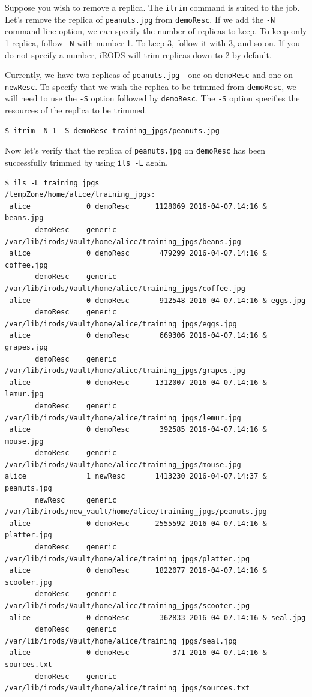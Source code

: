 \documentclass[10pt,oneside]{memoir}
\begin{document}
Suppose you wish to remove a replica. The \texttt{itrim} command is suited to the job. Let's remove the replica of \texttt{peanuts.jpg} from \texttt{demoResc}. If we add the \texttt{-N} command line option, we can specify the number of replicas to keep. To keep only 1 replica, follow \texttt{-N} with number 1. To keep 3, follow it with 3, and so on. If you do not specify a number, iRODS will trim replicas down to 2 by default.


Currently, we have two replicas of \texttt{peanuts.jpg}---one on \texttt{demoResc} and one on \texttt{newResc}. To specify that we wish the replica to be trimmed from \texttt{demoResc}, we will need to use the \texttt{-S} option followed by \texttt{demoResc}. The \texttt{-S} option specifies the resources of the replica to be trimmed.

\begin{lstlisting}
$ itrim -N 1 -S demoResc training_jpgs/peanuts.jpg
\end{lstlisting}

Now let's verify that the replica of \texttt{peanuts.jpg} on \texttt{demoResc} has been successfully trimmed by using \texttt{ils -L} again.

\begin{lstlisting}[basicstyle=\tiny\rmfamily]
$ ils -L training_jpgs
/tempZone/home/alice/training_jpgs:
 alice             0 demoResc      1128069 2016-04-07.14:16 & beans.jpg
       demoResc    generic    /var/lib/irods/Vault/home/alice/training_jpgs/beans.jpg
 alice             0 demoResc       479299 2016-04-07.14:16 & coffee.jpg
       demoResc    generic    /var/lib/irods/Vault/home/alice/training_jpgs/coffee.jpg
 alice             0 demoResc       912548 2016-04-07.14:16 & eggs.jpg
       demoResc    generic    /var/lib/irods/Vault/home/alice/training_jpgs/eggs.jpg
 alice             0 demoResc       669306 2016-04-07.14:16 & grapes.jpg
       demoResc    generic    /var/lib/irods/Vault/home/alice/training_jpgs/grapes.jpg
 alice             0 demoResc      1312007 2016-04-07.14:16 & lemur.jpg
       demoResc    generic    /var/lib/irods/Vault/home/alice/training_jpgs/lemur.jpg
 alice             0 demoResc       392585 2016-04-07.14:16 & mouse.jpg
       demoResc    generic    /var/lib/irods/Vault/home/alice/training_jpgs/mouse.jpg
alice              1 newResc       1413230 2016-04-07.14:37 & peanuts.jpg
       newResc     generic    /var/lib/irods/new_vault/home/alice/training_jpgs/peanuts.jpg
 alice             0 demoResc      2555592 2016-04-07.14:16 & platter.jpg
       demoResc    generic    /var/lib/irods/Vault/home/alice/training_jpgs/platter.jpg
 alice             0 demoResc      1822077 2016-04-07.14:16 & scooter.jpg
       demoResc    generic    /var/lib/irods/Vault/home/alice/training_jpgs/scooter.jpg
 alice             0 demoResc       362833 2016-04-07.14:16 & seal.jpg
       demoResc    generic    /var/lib/irods/Vault/home/alice/training_jpgs/seal.jpg
 alice             0 demoResc          371 2016-04-07.14:16 & sources.txt
       demoResc    generic    /var/lib/irods/Vault/home/alice/training_jpgs/sources.txt
\end{lstlisting}
\end{document}
